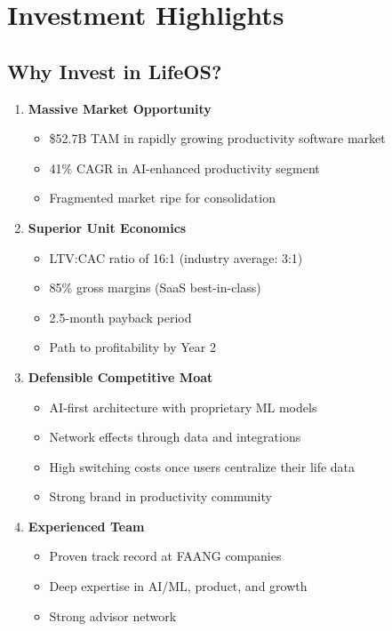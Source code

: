 \section{Investment Highlights}

\subsection{Why Invest in LifeOS?}

\begin{enumerate}
    \item \textbf{Massive Market Opportunity}
    \begin{itemize}
        \item \$52.7B TAM in rapidly growing productivity software market
        \item 41\% CAGR in AI-enhanced productivity segment
        \item Fragmented market ripe for consolidation
    \end{itemize}
    
    \item \textbf{Superior Unit Economics}
    \begin{itemize}
        \item LTV:CAC ratio of 16:1 (industry average: 3:1)
        \item 85\% gross margins (SaaS best-in-class)
        \item 2.5-month payback period
        \item Path to profitability by Year 2
    \end{itemize}
    
    \item \textbf{Defensible Competitive Moat}
    \begin{itemize}
        \item AI-first architecture with proprietary ML models
        \item Network effects through data and integrations
        \item High switching costs once users centralize their life data
        \item Strong brand in productivity community
    \end{itemize}
    
    \item \textbf{Experienced Team}
    \begin{itemize}
        \item Proven track record at FAANG companies
        \item Deep expertise in AI/ML, product, and growth
        \item Strong advisor network
    \end{itemize}
    

\end{enumerate}
